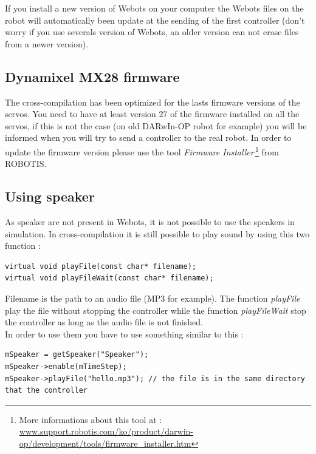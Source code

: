 \documentclass[a4paper, 12pt]{article}  		%
\begin{document}
If you install a new version of Webots on your computer the Webots files on the robot will automatically been update at the sending of the first controller (don't worry if you use severals version of Webots, an older version can not erase files from a newer version).\\

\subsection{Dynamixel MX28 firmware}
The cross-compilation has been optimized for the lasts firmware versions of the servos. You need to have at least version 27 of the firmware installed on all the servos, if this is not the case (on old DARwIn-OP robot for example) you will be informed when you will try to send a controller to the real robot. In order to update the firmware version please use the tool \textit{Firmware Installer}\,\footnote{ More informations about this tool at : \url{www.support.robotis.com/ko/product/darwin-op/development/tools/firmware_installer.htm}} from ROBOTIS.\\

\newpage
\subsection{Using speaker}
As speaker are not present in Webots, it is not possible to use the speakers in simulation. In cross-compilation it is still possible to play sound by using this two function :\\
\lstset{language=c++} 
\lstset{commentstyle=\textit} 
\begin{lstlisting} 
virtual void playFile(const char* filename);
virtual void playFileWait(const char* filename);
\end{lstlisting}
Filename is the path to an audio file (MP3 for example). The function \textit{playFile} play the file without stopping the controller while the function \textit{playFileWait} stop the controller as long as the audio file is not finished.\\

In order to use them you have to use something similar to this :\\
\lstset{language=c++} 
\lstset{commentstyle=\textit} 
\begin{lstlisting} 
mSpeaker = getSpeaker("Speaker");
mSpeaker->enable(mTimeStep);
mSpeaker->playFile("hello.mp3"); // the file is in the same directory that the controller
\end{lstlisting}
\end{document}
